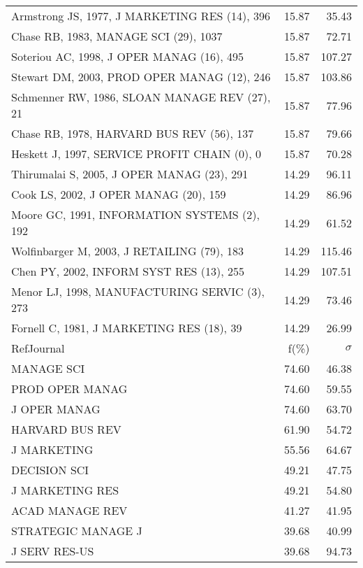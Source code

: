 \documentclass[a4paper,11pt]{report}
\begin{document}
\begin{landscape}
\begin{table}[!ht]
{\begin{tabular}{|l r r|}
Armstrong JS, 1977, J MARKETING RES (14), 396 & 15.87 & 35.43\\
Chase RB, 1983, MANAGE SCI (29), 1037 & 15.87 & 72.71\\
Soteriou AC, 1998, J OPER MANAG (16), 495 & 15.87 & 107.27\\
Stewart DM, 2003, PROD OPER MANAG (12), 246 & 15.87 & 103.86\\
Schmenner RW, 1986, SLOAN MANAGE REV (27), 21 & 15.87 & 77.96\\
Chase RB, 1978, HARVARD BUS REV (56), 137 & 15.87 & 79.66\\
Heskett J, 1997, SERVICE PROFIT CHAIN (0), 0 & 15.87 & 70.28\\
Thirumalai S, 2005, J OPER MANAG (23), 291 & 14.29 & 96.11\\
Cook LS, 2002, J OPER MANAG (20), 159 & 14.29 & 86.96\\
Moore GC, 1991, INFORMATION SYSTEMS (2), 192 & 14.29 & 61.52\\
Wolfinbarger M, 2003, J RETAILING (79), 183 & 14.29 & 115.46\\
Chen PY, 2002, INFORM SYST RES (13), 255 & 14.29 & 107.51\\
Menor LJ, 1998, MANUFACTURING SERVIC (3), 273 & 14.29 & 73.46\\
Fornell C, 1981, J MARKETING RES (18), 39 & 14.29 & 26.99\\
\hline
\hline
RefJournal & f(\%) & $\sigma$\\
\hline
MANAGE SCI & 74.60 & 46.38\\
PROD OPER MANAG & 74.60 & 59.55\\
J OPER MANAG & 74.60 & 63.70\\
HARVARD BUS REV & 61.90 & 54.72\\
J MARKETING & 55.56 & 64.67\\
DECISION SCI & 49.21 & 47.75\\
J MARKETING RES & 49.21 & 54.80\\
ACAD MANAGE REV & 41.27 & 41.95\\
STRATEGIC MANAGE J & 39.68 & 40.99\\
J SERV RES-US & 39.68 & 94.73\\
\hline
\end{tabular}
}
\end{table}

\clearpage


\end{landscape}
\end{document}
